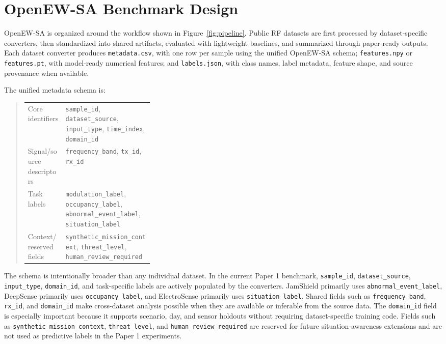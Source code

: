 \documentclass{ieeeaccess}
\newcommand{\artifact}[1]{\texttt{#1}}
\begin{document}
\section{OpenEW-SA Benchmark Design}

OpenEW-SA is organized around the workflow shown in Figure~\ref{fig:pipeline}. Public RF datasets are first processed by dataset-specific converters, then standardized into shared artifacts, evaluated with lightweight baselines, and summarized through paper-ready outputs. Each dataset converter produces \artifact{metadata.csv}, with one row per sample using the unified OpenEW-SA schema; \artifact{features.npy} or \artifact{features.pt}, with model-ready numerical features; and \artifact{labels.json}, with class names, label metadata, feature shape, and source provenance when available.

The unified metadata schema is:
\begin{quote}\scriptsize
\setlength{\tabcolsep}{2pt}
\begin{tabularx}{\linewidth}{@{}L{0.30\linewidth}Y@{}}
Core identifiers &
\artifact{sample\_id}, \artifact{dataset\_source}, \artifact{input\_type}, \artifact{time\_index}, \artifact{domain\_id} \\
Signal/source descriptors &
\artifact{frequency\_band}, \artifact{tx\_id}, \artifact{rx\_id} \\
Task labels &
\artifact{modulation\_label}, \artifact{occupancy\_label}, \artifact{abnormal\_event\_label}, \artifact{situation\_label} \\
Context/reserved fields &
\artifact{synthetic\_mission\_context}, \artifact{threat\_level}, \artifact{human\_review\_required}
\end{tabularx}
\end{quote}

The schema is intentionally broader than any individual dataset. In the current Paper 1 benchmark, \artifact{sample\_id}, \artifact{dataset\_source}, \artifact{input\_type}, \artifact{domain\_id}, and task-specific labels are actively populated by the converters. JamShield primarily uses \artifact{abnormal\_event\_label}, DeepSense primarily uses \artifact{occupancy\_label}, and ElectroSense primarily uses \artifact{situation\_label}. Shared fields such as \artifact{frequency\_band}, \artifact{rx\_id}, and \artifact{domain\_id} make cross-dataset analysis possible when they are available or inferable from the source data. The \artifact{domain\_id} field is especially important because it supports scenario, day, and sensor holdouts without requiring dataset-specific training code. Fields such as \artifact{synthetic\_mission\_context}, \artifact{threat\_level}, and \artifact{human\_review\_required} are reserved for future situation-awareness extensions and are not used as predictive labels in the Paper 1 experiments.
\end{document}
